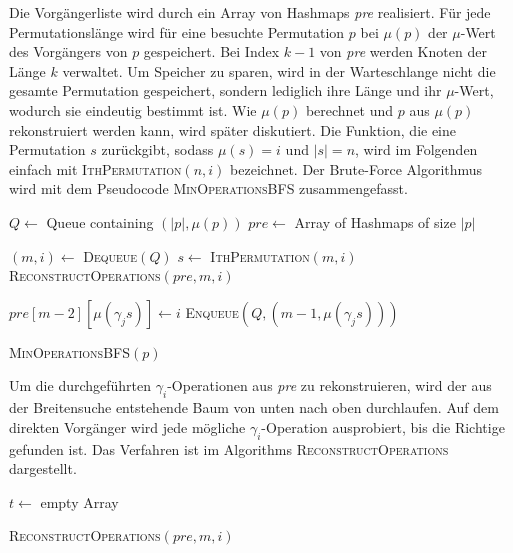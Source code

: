 \documentclass[a4paper, 10pt, ngerman]{article}
\begin{document}
Die Vorgängerliste wird durch ein Array von Hashmaps \emph{pre} realisiert. Für jede Permutationslänge wird für eine besuchte Permutation $p$ bei $\mu(p)$ der $\mu$-Wert des Vorgängers von $p$ gespeichert. Bei Index $k - 1$ von \emph{pre} werden Knoten der Länge $k$ verwaltet. Um Speicher zu sparen, wird in der Warteschlange nicht die gesamte Permutation gespeichert, sondern lediglich ihre Länge und ihr $\mu$-Wert, wodurch sie eindeutig bestimmt ist. Wie $\mu(p)$ berechnet und $p$ aus $\mu(p)$ rekonstruiert werden kann, wird später diskutiert. Die Funktion, die eine Permutation $s$ zurückgibt, sodass $\mu(s) = i$ und $|s| = n$, wird im Folgenden einfach mit \textsc{IthPermutation}$(n, i)$ bezeichnet. Der Brute-Force Algorithmus wird mit dem Pseudocode \textsc{MinOperationsBFS} zusammengefasst.

\begin{algorithm}
    $Q \gets$ Queue containing $(|p|, \mu(p))$ \;
    $pre \gets$ Array of Hashmaps of size $|p|$ \;

    {
        $(m, i) \gets $ \textsc{Dequeue}$(Q)$ \;
        $s \gets$ \textsc{IthPermutation}$(m, i)$ \;
        {
            \Return{} \textsc{ReconstructOperations}$(pre, m, i)$ \;
        }

        {
            {
                $pre[m - 2][\mu(\gamma_j s)] \gets i$ \;
                \textsc{Enqueue}$(Q, (m - 1, \mu(\gamma_j s)))$ \;
            }
        }
    }

    \caption{\textsc{MinOperationsBFS}$(p)$}
\end{algorithm}

Um die durchgeführten $\gamma_i$-Operationen aus \emph{pre} zu rekonstruieren, wird der aus der Breitensuche entstehende Baum von unten nach oben durchlaufen. Auf dem direkten Vorgänger wird jede mögliche $\gamma_i$-Operation ausprobiert, bis die Richtige gefunden ist. Das Verfahren ist im Algorithms \textsc{ReconstructOperations} dargestellt.

\begin{algorithm}
    $t \gets$ empty Array \;

     \;

    \caption{\textsc{ReconstructOperations}$(pre, m, i)$}
\end{algorithm}
\end{document}
